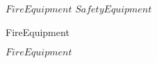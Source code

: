 \kClass $FireEquipment$ \kISO $SafetyEquipment$
\par
\kOperations
{}\begin{op}[e]{FireEquipment}%
\signature{() \Oto FireEquipment}
\parms{}
\end{op}
\kEnd $FireEquipment$

